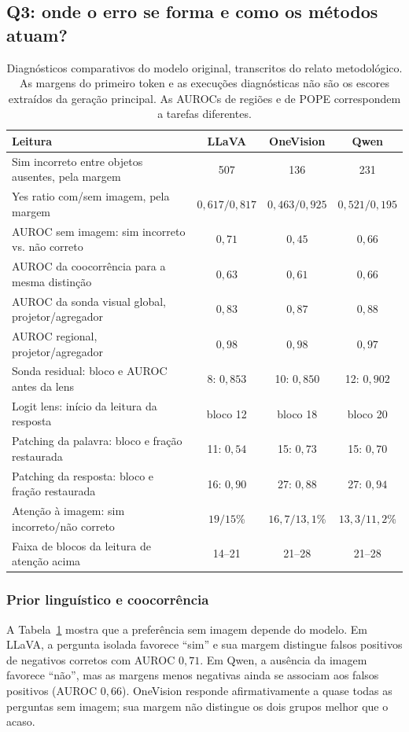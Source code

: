\subsection{Q3: onde o erro se forma e como os métodos atuam?}
\begin{table}[t]
\centering\small
\caption{Diagnósticos comparativos do modelo original, transcritos do relato metodológico. As margens do primeiro token e as execuções diagnósticas não são os escores extraídos da geração principal. As AUROCs de regiões e de POPE correspondem a tarefas diferentes.}
\label{tab:diag}
\begin{tabular}{lccc}\toprule
Leitura & LLaVA & OneVision & Qwen \\
\midrule
Sim incorreto entre objetos ausentes, pela margem & 507 & 136 & 231 \\
Yes ratio com/sem imagem, pela margem & $0{,}617/0{,}817$ & $0{,}463/0{,}925$ & $0{,}521/0{,}195$ \\
AUROC sem imagem: sim incorreto vs. não correto & $0{,}71$ & $0{,}45$ & $0{,}66$ \\
AUROC da coocorrência para a mesma distinção & $0{,}63$ & $0{,}61$ & $0{,}66$ \\
AUROC da sonda visual global, projetor/agregador & $0{,}83$ & $0{,}87$ & $0{,}88$ \\
AUROC regional, projetor/agregador & $0{,}98$ & $0{,}98$ & $0{,}97$ \\
Sonda residual: bloco e AUROC antes da lens & 8: $0{,}853$ & 10: $0{,}850$ & 12: $0{,}902$ \\
Logit lens: início da leitura da resposta & bloco 12 & bloco 18 & bloco 20 \\
Patching da palavra: bloco e fração restaurada & 11: $0{,}54$ & 15: $0{,}73$ & 15: $0{,}70$ \\
Patching da resposta: bloco e fração restaurada & 16: $0{,}90$ & 27: $0{,}88$ & 27: $0{,}94$ \\
Atenção à imagem: sim incorreto/não correto & $19/15$\% & $16{,}7/13{,}1$\% & $13{,}3/11{,}2$\% \\
Faixa de blocos da leitura de atenção acima & 14--21 & 21--28 & 21--28 \\
\bottomrule\end{tabular}
\end{table}

\subsubsection{Prior linguístico e coocorrência}
A Tabela~\ref{tab:diag} mostra que a preferência sem imagem depende do modelo. Em LLaVA, a pergunta isolada favorece ``sim'' e sua margem distingue falsos positivos de negativos corretos com AUROC $0{,}71$. Em Qwen, a ausência da imagem favorece ``não'', mas as margens menos negativas ainda se associam aos falsos positivos (AUROC $0{,}66$). OneVision responde afirmativamente a quase todas as perguntas sem imagem; sua margem não distingue os dois grupos melhor que o acaso.

